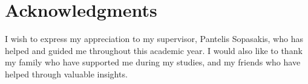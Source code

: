\section{Acknowledgments}

I wish to express my appreciation to my supervisor, Pantelis Sopasakis, who has helped and guided me throughout this academic year. I would also like to thank my family who have supported me during my studies, and my friends who have helped through valuable insights.
